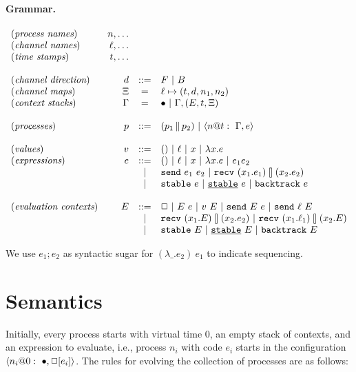 \documentclass{article}
\begin{document}
\paragraph*{Grammar.}

\[\begin{array}{lrcl}
(\textit{process names}) & n, \ldots \\
(\textit{channel names}) & \ell, \ldots \\
(\textit{time stamps}) & t, \ldots \\
\\
(\textit{channel direction}) & d &::=& F \alt B \\
(\textit{channel maps}) & \Xi &=& \ell \mapsto (t,d,n_1,n_2) \\
(\textit{context stacks}) & \Gamma &=& \bullet \alt \Gamma,(E,t,\Xi) \\
\\
(\textit{processes}) & p &::=& (\parc{p_1}{p_2}) \alt \proc{n}{\Gamma}{e}{t} \\
\\
(\textit{values}) & v &::=& () \alt \ell \alt x \alt \lambda x.e \\
(\textit{expressions}) & e &::=& () \alt \ell \alt x \alt \lambda x.e 
  \alt e_1e_2 \\
  &&\alt& \send{e_1}{e_2} \alt \recv{x_1}{e_1}{x_2}{e_2} \\
  &&\alt& \stable{e} \alt \stableu{e} \alt \backtrack{e} \\
\\
(\textit{evaluation contexts}) & E &::=& \Box \alt E~e \alt v~E \alt 
  \send{E}{e} \alt \send{\ell}{E} \\
  &&\alt& \recv{x_1}{E}{x_2}{e_2} \alt \recv{x_1}{\ell_1}{x_2}{E} \\
  &&\alt& \stable{E} \alt \stableu{E} \alt \backtrack{E}
\end{array}\]

We use $e_1;e_2$ as syntactic sugar for $(\lambda \_.e_2)~e_1$ to indicate
sequencing.

\section{Semantics} 

Initially, every process starts with virtual time 0, an empty stack of
contexts, and an expression to evaluate, i.e., process $n_i$ with code $e_i$
starts in the configuration $\proc{n_i}{\bullet}{\Box[e_i]}{0}$. The rules
for evolving the collection of processes are as follows:
\end{document}
